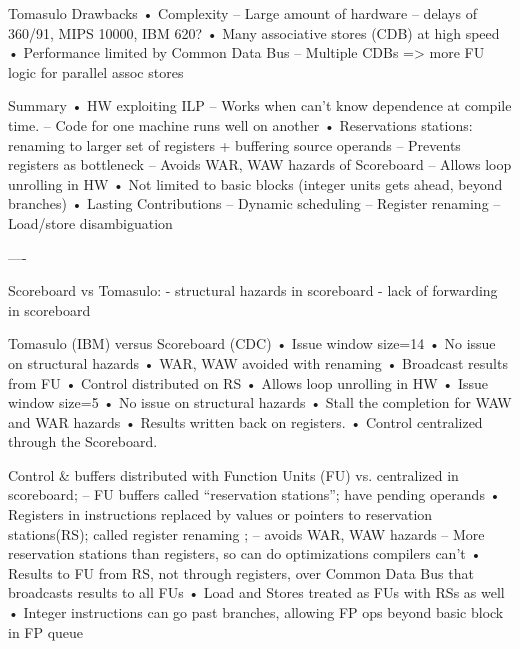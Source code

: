 Tomasulo Drawbacks
• Complexity
– Large amount of hardware
– delays of 360/91, MIPS 10000, IBM 620?
• Many associative stores (CDB) at high speed
• Performance limited by Common Data Bus
– Multiple CDBs => more FU logic for parallel assoc
stores

Summary
• HW exploiting ILP
– Works when can’t know dependence at compile time.
– Code for one machine runs well on another
• Reservations stations: renaming to larger set of registers
+ buffering source operands
– Prevents registers as bottleneck
– Avoids WAR, WAW hazards of Scoreboard
– Allows loop unrolling in HW
• Not limited to basic blocks
(integer units gets ahead, beyond branches)
• Lasting Contributions
– Dynamic scheduling
– Register renaming
– Load/store disambiguation


----


Scoreboard vs Tomasulo:
- structural hazards in scoreboard
- lack of forwarding in scoreboard

Tomasulo (IBM) versus Scoreboard (CDC)
• Issue window size=14
• No issue on structural
hazards
• WAR, WAW avoided with
renaming
• Broadcast results from FU
• Control distributed on RS
• Allows loop unrolling in
HW
• Issue window size=5
• No issue on structural
hazards
• Stall the completion for
WAW and WAR hazards
• Results written back on
registers.
• Control centralized
through the Scoreboard.

Control \& buffers distributed with Function Units (FU) vs.
centralized in scoreboard;
– FU buffers called “reservation stations”;
    have pending operands
• Registers in instructions replaced by values or pointers
to reservation stations(RS); called register renaming ;
– avoids WAR, WAW hazards
– More reservation stations than registers, so can do optimizations
compilers can’t
• Results to FU from RS, not through registers, over
Common Data Bus that broadcasts results to all FUs
• Load and Stores treated as FUs with RSs as well
• Integer instructions can go past branches, allowing
FP ops beyond basic block in FP queue


